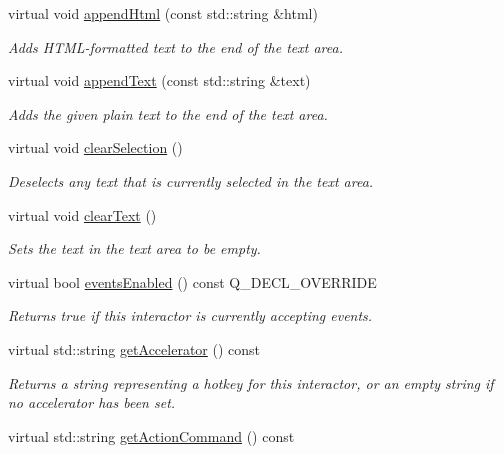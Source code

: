 \begin{DoxyCompactItemize}
virtual void \mbox{\hyperlink{classGTextArea_aa3457253e58dbfbf65a8f5a28c65fb5f}{append\+Html}} (const std\+::string \&html)
\begin{DoxyCompactList}\small\item\em Adds H\+T\+M\+L-\/formatted text to the end of the text area. \end{DoxyCompactList}\item 
virtual void \mbox{\hyperlink{classGTextArea_a6ba815b59563007b60dc2052d4703146}{append\+Text}} (const std\+::string \&text)
\begin{DoxyCompactList}\small\item\em Adds the given plain text to the end of the text area. \end{DoxyCompactList}\item 
virtual void \mbox{\hyperlink{classGTextArea_abd07e172ccec6823a88289c21124a367}{clear\+Selection}} ()
\begin{DoxyCompactList}\small\item\em Deselects any text that is currently selected in the text area. \end{DoxyCompactList}\item 
virtual void \mbox{\hyperlink{classGTextArea_a25f53c7d92eb2a5197cd4418c0165367}{clear\+Text}} ()
\begin{DoxyCompactList}\small\item\em Sets the text in the text area to be empty. \end{DoxyCompactList}\item 
virtual bool \mbox{\hyperlink{classGInteractor_ac05ba5b92e2e5146d416fe7f842a0969}{events\+Enabled}} () const Q\+\_\+\+D\+E\+C\+L\+\_\+\+O\+V\+E\+R\+R\+I\+DE
\begin{DoxyCompactList}\small\item\em Returns true if this interactor is currently accepting events. \end{DoxyCompactList}\item 
virtual std\+::string \mbox{\hyperlink{classGInteractor_a69f8d23ed8f207fbecad99960776e942}{get\+Accelerator}} () const
\begin{DoxyCompactList}\small\item\em Returns a string representing a hotkey for this interactor, or an empty string if no accelerator has been set. \end{DoxyCompactList}\item 
virtual std\+::string \mbox{\hyperlink{classGInteractor_a94eb4276000c4fdfb508ce9e6317a82a}{get\+Action\+Command}} () const

\end{DoxyCompactItemize}
